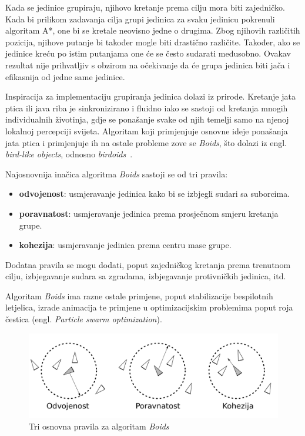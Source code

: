 \documentclass[times, utf8, zavrsni, numeric]{fer}
\begin{document}
\par Kada se jedinice grupiraju, njihovo kretanje prema cilju mora biti zajedničko.
Kada bi prilikom zadavanja cilja grupi jedinica za svaku jedinicu pokrenuli algoritam A*, one bi se kretale neovisno jedne o drugima. 
Zbog njihovih različitih pozicija, njihove putanje bi također mogle biti drastično različite. 
Također, ako se jedinice kreću po istim putanjama one će se često sudarati međusobno. 
Ovakav rezultat nije prihvatljiv s obzirom na očekivanje da će grupa jedinica biti jača i efikasnija od jedne same jedinice.

\par Inspiracija za implementaciju grupiranja jedinica dolazi iz prirode. 
Kretanje jata ptica ili java riba je sinkronizirano i fluidno iako se sastoji od kretanja mnogih individualnih životinja, gdje se ponašanje svake od njih temelji samo na njenoj lokalnoj percepciji svijeta.
Algoritam koji primjenjuje osnovne ideje ponašanja jata ptica i primjenjuje ih na ostale probleme zove se \textit{Boids}, što dolazi iz engl. \textit{bird-like objects}, odnosno \textit{birdoids}~\cite{article:FlocksHerdsSchools}.

\par Najosnovnija inačica algoritma \textit{Boids} sastoji se od tri pravila:
\begin{itemize}
	\item \textbf{odvojenost}: usmjeravanje jedinica kako bi se izbjegli sudari sa suborcima.
	\item \textbf{poravnatost}: usmjeravanje jedinica prema prosječnom smjeru kretanja grupe.
	\item \textbf{kohezija}: usmjeravanje jedinica prema centru mase grupe. 	 
\end{itemize}
Dodatna pravila se mogu dodati, poput zajedničkog kretanja prema trenutnom cilju, izbjegavanje sudara sa zgradama, izbjegavanje protivničkih jedinica, itd.

\par Algoritam \textit{Boids} ima razne ostale primjene, poput stabilizacije bespilotnih letjelica, izrade animacija te primjene u optimizacijskim problemima poput roja čestica (engl. \textit{Particle swarm optimization}).

\begin{figure}[h]
	\centering
	\includegraphics[width=1.0\linewidth]{images/boids.pdf}
	\caption{Tri osnovna pravila za algoritam \textit{Boids}}
	\label{fig:boids}
\end{figure}
\end{document}
